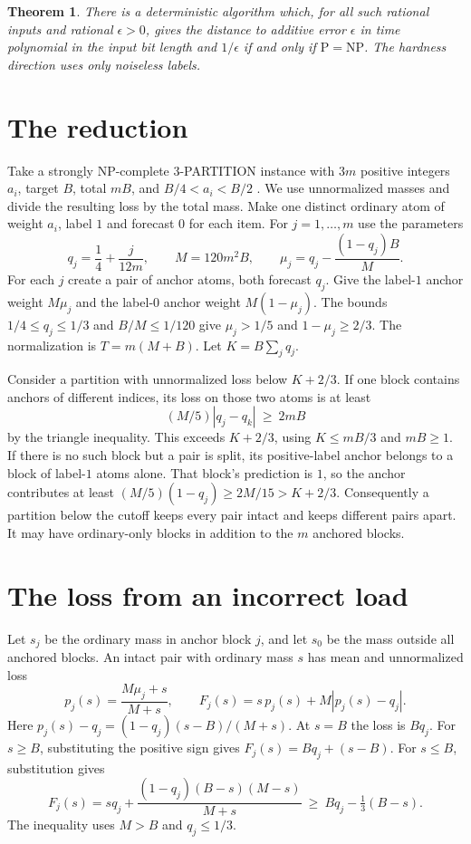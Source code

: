 \documentclass[11pt,a4paper]{amsart}
\newtheorem{theorem}{Theorem}
\begin{document}
\begin{theorem}\label{main}
There is a deterministic algorithm which, for all such rational
inputs and rational \(\epsilon>0\), gives the distance to additive error
\(\epsilon\) in time polynomial in the input bit length and
\(1/\epsilon\) if and only if \(\mathrm P=\mathrm{NP}\).
The hardness direction uses only noiseless labels.
\end{theorem}

\section{The reduction}

Take a strongly NP-complete 3-PARTITION instance with \(3m\) positive
integers \(a_i\), target \(B\), total \(mB\), and
\(B/4<a_i<B/2\) \cite{gj}. We use unnormalized masses and divide
the resulting loss by the total mass. Make one distinct ordinary
atom of weight \(a_i\), label \(1\) and forecast \(0\) for each item.
For \(j=1,\ldots,m\) use the parameters
\[
 q_j=\frac14+\frac{j}{12m},\qquad
 M=120m^2B,\qquad
 \mu_j=q_j-\frac{(1-q_j)B}{M}.
\]
For each \(j\) create a pair of anchor atoms, both forecast \(q_j\).
Give the label-\(1\) anchor weight \(M\mu_j\) and the label-\(0\)
anchor weight \(M(1-\mu_j)\). The bounds \(1/4\le q_j\le1/3\)
and \(B/M\le1/120\) give \(\mu_j>1/5\) and \(1-\mu_j\ge2/3\).
The normalization is \(T=m(M+B)\). Let \(K=B\sum_jq_j\).

Consider a partition with unnormalized loss below \(K+2/3\).
If one block contains anchors of different indices, its loss
on those two atoms is at least
\[
   (M/5)|q_j-q_k|\ \ge\ 2mB
\]
by the triangle inequality. This exceeds \(K+2/3\), using
\(K\le mB/3\) and \(mB\ge1\). If there is no such block but a
pair is split, its positive-label anchor belongs to a block of
label-\(1\) atoms alone. That block's prediction is \(1\), so
the anchor contributes at least
\((M/5)(1-q_j)\ge 2M/15>K+2/3\).
Consequently a partition below the cutoff keeps every pair
intact and keeps different pairs apart. It may have ordinary-only
blocks in addition to the \(m\) anchored blocks.

\section{The loss from an incorrect load}

Let \(s_j\) be the ordinary mass in anchor block \(j\),
and let \(s_0\) be the mass outside all anchored blocks.
An intact pair with ordinary mass \(s\) has mean
and unnormalized loss
\[
 p_j(s)=\frac{M\mu_j+s}{M+s},\qquad
 F_j(s)=s\,p_j(s)+M|p_j(s)-q_j|.
\]
Here
\(p_j(s)-q_j=(1-q_j)(s-B)/(M+s)\).
At \(s=B\) the loss is \(Bq_j\).
For \(s\ge B\), substituting the positive sign gives
\(F_j(s)=Bq_j+(s-B)\).
For \(s\le B\), substitution gives
\[
 F_j(s)
   =s q_j+\frac{(1-q_j)(B-s)(M-s)}{M+s}
   \ \ge\ Bq_j-\tfrac13(B-s).
\]
The inequality uses \(M>B\) and \(q_j\le 1/3\).
\end{document}
